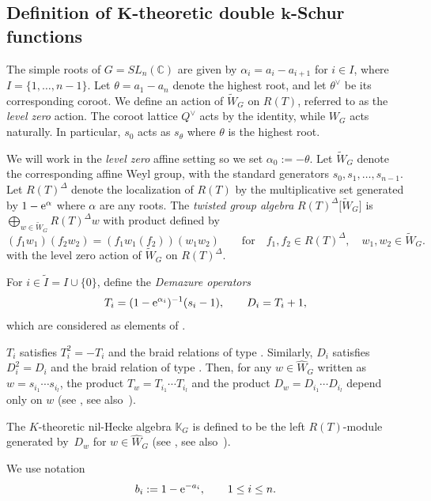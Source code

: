 \documentclass[pdftex]{sigma}
\numberwithin{equation}{section}
\newcommand{\C}{\mathbb{C}}
\newcommand{\reg}{\Delta}
\newcommand{\Rep}{{R(T)}}
\theoremstyle{definition}
\begin{document}
\subsection[Definition of K-theoretic double k-Schur functions]{Definition of $\boldsymbol{K}$-theoretic double $\boldsymbol{k}$-Schur functions}
\label{sec:def_K-k}
The simple roots of $G=SL_n(\C)$ are given by
$\alpha_i=a_i-a_{i+1}$ for $i\in I$, where
$I=\{1,\dots,n-1\}$.
Let $\theta=a_1-a_n$ denote the highest root, and let $\theta^\vee$ be its corresponding coroot.
We define an action of $\tilde{W}_G$ on $R(T)$, referred to as the \emph{level zero} action. The coroot lattice $Q^\lor$ acts by the identity, while
$W_G$ acts naturally. In particular, $s_0$ acts as $s_\theta$ where $\theta$ is the highest root.

We will work in the \emph{level zero} affine setting so we set $\alpha_0:=-\theta$.
Let $\tilde{W}_G$ denote the corresponding affine Weyl group, with the standard generators $s_0,s_1,\dots,s_{n-1}$.
Let $\Rep^\reg$ denote the localization of $\Rep$ by
the multiplicative set generated by $1-{\rm e}^{\alpha}$ where
$\alpha$ are any roots.
The \emph{twisted group algebra} $\Rep^\reg\big[\tilde{W}_G\big]$
is $\bigoplus_{w\in\tilde{W}_G }\Rep^\reg w$ with product defined by
\[
(f_1w_1)(f_2w_2)=(f_1w_1(f_2))(w_1w_2)
\qquad \text{for}\quad f_1,f_2\in\Rep^\reg,\quad w_1,w_2\in \tilde{W}_G.
\]
with the level zero action of
$\tilde{W}_G$ on $\Rep^\reg$.


For $i\in \tilde{I}=I\cup\{0\}$, define the \emph{ Demazure operators}
\begin{equation}
\label{eq:def_Demazure}
T_i=(1-{\rm e}^{\alpha_i})^{-1}(s_i-1),\qquad
D_i=T_i+1,
\end{equation}
which are considered as
elements of \smash{$\Rep^\reg\big[\tilde{W}_G\big]$}.


$T_i$ satisfies $T_i^2 = -T_i$ and the braid relations of type . Similarly, $D_i$ satisfies $D_i^2 = D_i$ and the braid relation of type . Then, for any $ w \in \hat{W}_G$ written as $w = s_{i_1} \cdots s_{i_l}$, the product
$
T_w = T_{i_1} \cdots T_{i_l}
$ and the product
$
D_w = D_{i_1} \cdots D_{i_l}
$ depend only on $w$ (see \cite{LSS:K}, see also~\cite{ISY}).

The $K$-theoretic nil-Hecke algebra $\mathbb{K}_G$ is defined to be the left $\Rep$-module
generated by~$D_w$ for $w\in \hat{W}_G$
(see \cite{LSS:K}, see also~\cite{ISY}).

We use notation
\begin{equation}
\label{eq:b_i}
b_i:=1-{\rm e}^{-a_i},\qquad 1\le i\le n.
\end{equation}
\end{document}
